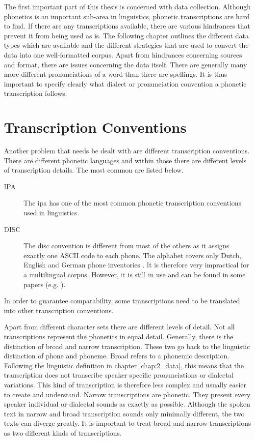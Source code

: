 \label{chap:2_data}
The first important part of this thesis is concerned with data collection. Although phonetics is an important sub-area in linguistics, phonetic transcriptions are hard to find. If there are any transcriptions available, there are various hindrances that prevent it from being used as is. The following chapter outlines the different data types which are available and the different strategies that are used to convert the data into one well-formatted corpus. Apart from hindrances concerning sources and format, there are issues concerning the data itself. There are generally many more different pronunciations of a word than there are spellings. It is thus important to specify clearly what dialect or pronunciation convention a phonetic transcription follows.

\section{Transcription Conventions}
\label{transcb-conventions}
Another problem that needs be dealt with are different transcription conventions. There are different phonetic languages and within those there are different levels of transcription details. The most common are listed below.

\begin{description}
\item[IPA] The \ac{ipa} has one of the most common phonetic transcription conventions used in linguistics. 
\item[DISC] The \acs{disc} convention is different from most of the others as it assigns exactly one ASCII code to each phone. The alphabet covers only Dutch, English and German phone inventories \citep{celex2-documentation}. It is therefore very impractical for a multilingual corpus. However, it is still in use and can be found in some papers (e.g. \cite{Rao2015GraphemetophonemeCU}). 
\end{description}

In order to guarantee comparability, some transcriptions need to be translated into other transcription conventions.

Apart from different character sets there are different levels of detail. Not all transcriptions represent the phonetics in equal detail. Generally, there is the distinction of broad and narrow transcription. These two go back to the linguistic distinction of phone and phoneme. Broad refers to a phonemic description. Following the linguistic definition in chapter \ref{chap:2_data}, this means that the transcription does not transcribe speaker specific pronunciations or dialectal variations. This kind of transcription is therefore less complex and usually easier to create and understand. Narrow transcriptions are phonetic. They present every speaker individual or dialectal sounds as exactly as possible. Although the spoken text in narrow and broad transcription sounds only minimally different, the two texts can diverge greatly. It is important to treat broad and narrow transcriptions as two different kinds of transcriptions. 



